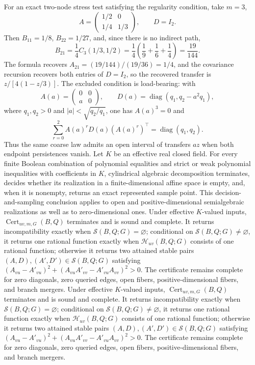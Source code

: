 For an exact two-node stress test satisfying the regularity condition, take \(m=3\),
\[
 A=\begin{pmatrix}1/2&0\\1/4&1/3\end{pmatrix},
 \qquad D=I_2.
\]
Then \(B_{11}=1/8\), \(B_{22}=1/27\), and, since there is no indirect path,
\[
 B_{21}=\frac14 C_3(1/3,1/2)
 =\frac14\left(\frac19+\frac16+\frac14\right)=\frac{19}{144}.
\]
The formula recovers \(A_{21}=(19/144)/(19/36)=1/4\), and the covariance recursion recovers both entries of \(D=I_2\), so the recovered transfer is \(z/[4(1-z/3)]\).  The excluded condition is load-bearing: with
\[
 A(a)=\begin{pmatrix}0&0\\a&0\end{pmatrix},\qquad
 D(a)=\operatorname{diag}(q_1,q_2-a^2q_1),
\]
where \(q_1,q_2>0\) and \(|a|<\sqrt{q_2/q_1}\), one has \(A(a)^3=0\) and
\[
 \sum_{r=0}^{2}A(a)^rD(a)(A(a)^r)^\top
 =\operatorname{diag}(q_1,q_2).
\]
Thus the same coarse law admits an open interval of transfers \(az\) when both endpoint persistences vanish.
Let \(K\) be an effective real closed field.  For every finite Boolean combination of polynomial equalities and strict or weak polynomial inequalities with coefficients in \(K\), cylindrical algebraic decomposition terminates, decides whether its realization in a finite-dimensional affine space is empty, and, when it is nonempty, returns an exact represented sample point.  This decision-and-sampling conclusion applies to open and positive-dimensional semialgebraic realizations as well as to zero-dimensional ones.
Under effective \(K\)-valued inputs, \(\operatorname{Cert}_{uv,m,G}(B,Q)\) terminates and is sound and complete. It returns incompatibility exactly when \(\mathcal S(B,Q;G)=\varnothing\); conditional on \(\mathcal S(B,Q;G)\ne\varnothing\), it returns one rational function exactly when \(\mathcal H_{uv}(B,Q;G)\) consists of one rational function; otherwise it returns two attained stable pairs \((A,D),(A',D')\in\mathcal S(B,Q;G)\) satisfying \((A_{vu}-A'_{vu})^2+(A_{vu}A'_{vv}-A'_{vu}A_{vv})^2>0\). The certificate remains complete for zero diagonals, zero queried edges, open fibers, positive-dimensional fibers, and branch mergers.
Under effective \(K\)-valued inputs, \(\operatorname{Cert}_{uv,m,G}(B,Q)\) terminates and is sound and complete. It returns incompatibility exactly when \(\mathcal S(B,Q;G)=\varnothing\); conditional on \(\mathcal S(B,Q;G)\ne\varnothing\), it returns one rational function exactly when \(\mathcal H_{uv}(B,Q;G)\) consists of one rational function; otherwise it returns two attained stable pairs \((A,D),(A',D')\in\mathcal S(B,Q;G)\) satisfying \((A_{vu}-A'_{vu})^2+(A_{vu}A'_{vv}-A'_{vu}A_{vv})^2>0\). The certificate remains complete for zero diagonals, zero queried edges, open fibers, positive-dimensional fibers, and branch mergers.
